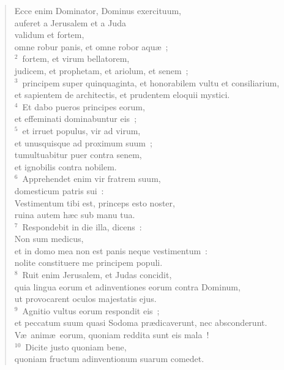 \begin{flushleft}\begin{verse}\vspace{-19pt}Ecce enim Dominator, Dominus exercituum,\\ auferet a Jerusalem et a Juda\\ validum et fortem,\\ omne robur panis, et omne robor aqu\ae~;\\
${}^{2}$~fortem, et virum bellatorem,\\ judicem, et prophetam, et ariolum, et senem~;\\
${}^{3}$~principem super quinquaginta, et honorabilem vultu et consiliarium,\\ et sapientem de architectis, et prudentem eloquii mystici.\\
${}^{4}$~Et dabo pueros principes eorum,\\ et effeminati dominabuntur eis~;\\
${}^{5}$~et irruet populus, vir ad virum,\\ et unusquisque ad proximum suum~;\\ tumultuabitur puer contra senem,\\ et ignobilis contra nobilem.\\
${}^{6}$~Apprehendet enim vir fratrem suum,\\ domesticum patris sui~:\\ Vestimentum tibi est, princeps esto noster,\\ ruina autem h\ae c sub manu tua.\\
${}^{7}$~Respondebit in die illa, dicens~:\\ Non sum medicus,\\ et in domo mea non est panis neque vestimentum~:\\ nolite constituere me principem populi.\\
${}^{8}$~Ruit enim Jerusalem, et Judas concidit,\\ quia lingua eorum et adinventiones eorum contra Dominum,\\ ut provocarent oculos majestatis ejus.\\
${}^{9}$~Agnitio vultus eorum respondit eis~;\\ et peccatum suum quasi Sodoma pr\ae dicaverunt, nec absconderunt.\\ V\ae\ anim\ae\ eorum, quoniam reddita sunt eis mala~!\\
${}^{10}$~Dicite justo quoniam bene,\\ quoniam fructum adinventionum suarum comedet.\\

\end{verse}
\end{flushleft}

